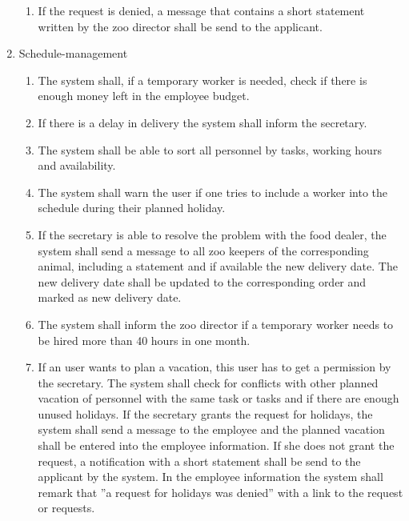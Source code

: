 \begin{enumerate}[label*=\arabic*]
\begin{enumerate}[label*=\arabic*]
	\item If the request is denied, a message that contains a short statement written by the zoo director shall be send to the applicant.
\end{enumerate}
\item Schedule-management
	\begin{enumerate}[label*=\arabic*]
		\item The system shall, if a temporary worker is needed, check if there is enough money left in the employee budget. 
		\item If there is a delay in delivery the system shall inform the secretary.
		\item The system shall be able to sort all personnel by tasks, working hours and availability.
		\item The system shall warn the user if one tries to include a worker into the schedule during their planned holiday.
		\item If the secretary is able to resolve the problem with the food dealer, the system shall send a message to all zoo keepers of the corresponding animal, including a statement and if available the new delivery date. The new delivery date shall be updated to the corresponding order and marked as new delivery date.
		\item The system shall inform the zoo director if a temporary worker needs to be hired more than 40 hours in one month.
		\item If an user wants to plan a vacation, this user has to get a permission by the secretary. The system shall check for conflicts with other planned vacation of personnel with the same task or tasks and if there are enough unused holidays. If the secretary grants the request for holidays, the system shall send a message to the employee and the planned vacation shall be entered into the employee information. If she does not grant the request, a notification with a short statement shall be send to the applicant by the system. In the employee information the system shall remark that ”a request for holidays was denied” with a link to the request or requests.
\end{enumerate}
\end{enumerate}
